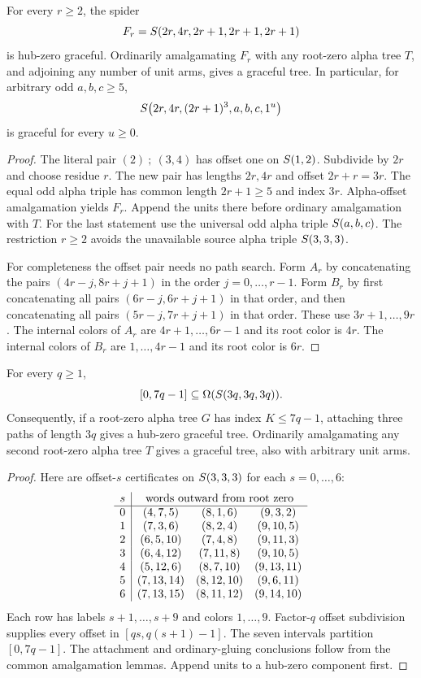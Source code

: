 \begin{proposition}\label{eight:double-five-core}
For every $r\ge2$, the spider
\[
 F_r=S\!\left(2r,4r,2r+1,2r+1,2r+1\right)
\]
is hub-zero graceful.  Ordinarily amalgamating $F_r$ with any
root-zero alpha tree $T$, and adjoining any number of unit arms, gives
a graceful tree.  In particular, for arbitrary odd $a,b,c\ge5$,
\[
 S\!\left(2r,4r,(2r+1)^3,a,b,c,1^u\right)
\]
is graceful for every $u\ge0$.
\end{proposition}
\begin{proof}
The literal pair $(2)\ ;\ (3,4)$ has offset one on $S\!\left(1,2\right)$.
Subdivide by $2r$ and choose residue $r$.  The new pair has lengths
$2r,4r$ and offset $2r+r=3r$.  The equal odd alpha triple has common
length $2r+1\ge5$ and index $3r$.  Alpha-offset amalgamation yields
$F_r$.  Append the units there before ordinary amalgamation with $T$.
For the last statement use the universal odd alpha triple $S\!\left(a,b,c\right)$.
The restriction $r\ge2$ avoids the unavailable source alpha triple
$S\!\left(3,3,3\right)$.

For completeness the offset pair needs no path search.  Form $A_r$
by concatenating the pairs $(4r-j,8r+j+1)$ in the order
$j=0,\ldots,r-1$.  Form $B_r$ by first concatenating all pairs
$(6r-j,6r+j+1)$ in that order, and then concatenating all pairs
$(5r-j,7r+j+1)$ in that order.
These use $3r+1,\ldots,9r$.  The internal colors of $A_r$ are
$4r+1,\ldots,6r-1$ and its root color is $4r$.  The internal colors
of $B_r$ are $1,\ldots,4r-1$ and its root color is $6r$.
\end{proof}

\begin{proposition}\label{eight:three-equal-offsets}
For every $q\ge1$,
\[
 [0,7q-1]\subseteq\Omega(S\!\left(3q,3q,3q\right)).
\]
Consequently, if a root-zero alpha tree $G$ has index $K\le7q-1$,
attaching three paths of length $3q$ gives a hub-zero graceful tree.
Ordinarily amalgamating any second root-zero alpha tree $T$ gives a
graceful tree, also with arbitrary unit arms.
\end{proposition}
\begin{proof}
Here are offset-$s$ certificates on $S\!\left(3,3,3\right)$ for each $s=0,\ldots,6$:
\[
\begin{array}{c|ccc}
s&\multicolumn{3}{c}{\text{words outward from root zero}}\\ \hline
0&(4,7,5)&(8,1,6)&(9,3,2)\\
1&(7,3,6)&(8,2,4)&(9,10,5)\\
2&(6,5,10)&(7,4,8)&(9,11,3)\\
3&(6,4,12)&(7,11,8)&(9,10,5)\\
4&(5,12,6)&(8,7,10)&(9,13,11)\\
5&(7,13,14)&(8,12,10)&(9,6,11)\\
6&(7,13,15)&(8,11,12)&(9,14,10)
\end{array}
\]
Each row has labels $s+1,\ldots,s+9$ and colors $1,\ldots,9$.
Factor-$q$ offset subdivision supplies every offset in
$[qs,q(s+1)-1]$.  The seven intervals partition $[0,7q-1]$.
The attachment and ordinary-gluing conclusions follow from the common
amalgamation lemmas.  Append units to a hub-zero component first.
\end{proof}

